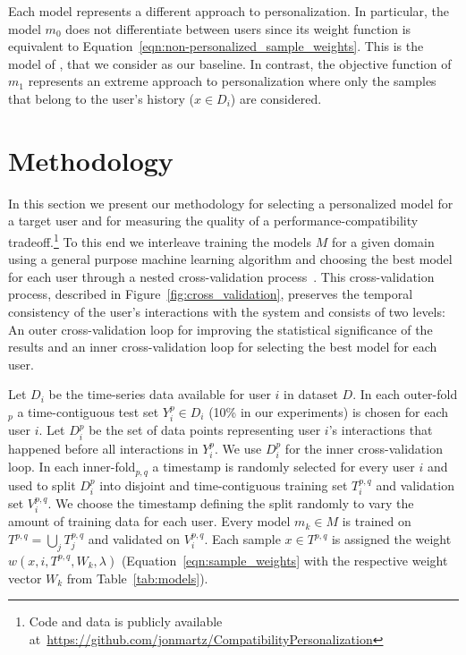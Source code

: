 \documentclass[letterpaper]{article} %
\theoremstyle{definition}
\begin{document}
Each model represents a different approach to personalization. In particular, the model $m_0$ does not differentiate between users since its weight function is equivalent to Equation~\ref{eqn:non-personalized_sample_weights}.
This is the model of \citet{bansal2019beyond}, that we consider as our baseline.
In contrast, the objective function of $m_1$ represents an extreme approach to personalization where only the samples that belong to the user's history ($x\in D_i$) are considered.





















\section{Methodology}
\label{sec:methodology}
In this  section we present  our  methodology for selecting a personalized model for a target user and for measuring the quality of a performance-compatibility tradeoff.\footnote{Code and data  is publicly available  at~\url{https://github.com/jonmartz/CompatibilityPersonalization}}
To this end we interleave training the models $M$ for a given domain using a general purpose machine learning algorithm and  choosing the  best model for each user through a nested  cross-validation process~\cite{tashman2000out}.
This cross-validation process, described in Figure~\ref{fig:cross_validation}, preserves the temporal consistency of the user's interactions with the system and consists of two levels: An outer cross-validation loop for improving the statistical significance of the results and an inner cross-validation loop for selecting the best model for each user.

Let $D_i$ be the time-series data available for user $i$ in dataset $D$. In each outer-fold$_p$ a time-contiguous test set $Y_i^p\in D_i$ (10\% in our experiments) is chosen for each user $i$.
Let $D_i^p$ be the set of data points representing user $i$'s interactions that happened before all interactions in $Y_i^p$. We use $D_i^p$ for the inner cross-validation loop.
In each inner-fold$_{p,q}$ a timestamp is randomly selected for every user $i$ and used to split $D_i^p$ into disjoint and time-contiguous training set $T_i^{p,q}$ and validation set $V_i^{p,q}$.
We choose the timestamp defining the split randomly to vary the amount of training data for each user.
Every model $m_k\in M$ is trained on $T^{p,q}=\bigcup_j T_j^{p,q}$  and validated on $V_i^{p,q}$.
Each sample $x\in T^{p,q}$ is assigned the weight $w(x,i,T^{p,q},W_k,\lambda)$ (Equation~\ref{eqn:sample_weights} with the respective weight vector $W_k$ from Table~\ref{tab:models}).
\end{document}
